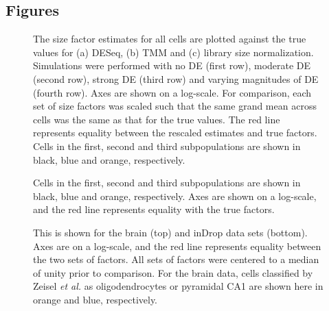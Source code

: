 \documentclass{bmcart}
\begin{document}
\begin{backmatter}


\section*{Figures}

\begin{figure}[tbp]
\caption{
    The size factor estimates for all cells are plotted against the true values for (a) DESeq,
        (b) TMM and (c) library size normalization.
    Simulations were performed with no DE (first row), moderate DE (second row), strong DE (third row) and varying magnitudes of DE (fourth row).
    Axes are shown on a log-scale.
    For comparison, each set of size factors was scaled such that the same grand mean across cells was the same as that for the true values.
    The red line represents equality between the rescaled estimates and true factors.
    Cells in the first, second and third subpopulations are shown in black, blue and orange, respectively.
}
\label{fig:existing_sim}
\end{figure}

\begin{figure}[btp]
\caption{
    Cells in the first, second and third subpopulations are shown in black, blue and orange, respectively.
    Axes are shown on a log-scale, and the red line represents equality with the true factors.
}
\label{fig:sim_cluster_DE}
\end{figure}

\begin{figure}[btp]
\caption{
    This is shown for the brain (top) and inDrop data sets (bottom).
    Axes are on a log-scale, and the red line represents equality between the two sets of factors.
    All sets of factors were centered to a median of unity prior to comparison.
    For the brain data, cells classified by Zeisel \textit{et al.} as oligodendrocytes or pyramidal CA1 are shown here in orange and blue, respectively.
}   
\label{fig:real_comp}
\end{figure}



\end{backmatter}
\end{document}
